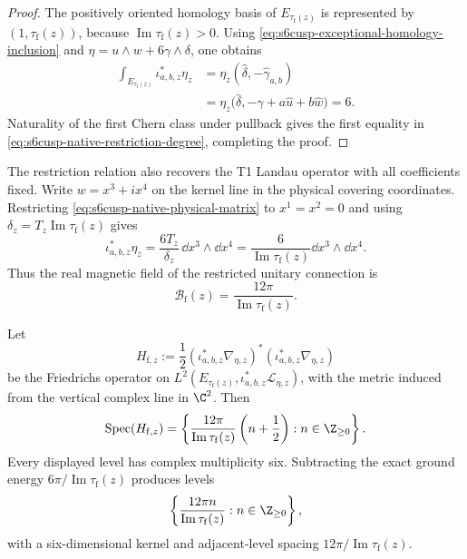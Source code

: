 \begin{proof}
The positively oriented homology basis of
\(E_{\tau_{\mathrm f}(z)}\) is represented by
\((1,\tau_{\mathrm f}(z))\), because
\(\operatorname{Im}\tau_{\mathrm f}(z)>0\).  Using
\eqref{eq:s6cusp-exceptional-homology-inclusion} and
\(\eta=u\wedge w+6\gamma\wedge\delta\), one obtains
\begin{align*}
 \int_{E_{\tau_{\mathrm f}(z)}}\iota_{a,b,z}^*\eta_z
 &=\eta_z(\widehat\delta,-\widehat\gamma_{a,b})\\
 &=\eta_z\bigl(
 \widehat\delta,
 -\widehat\gamma+a\widehat u+b\widehat w
 \bigr)=6.
\end{align*}
Naturality of the first Chern class under pullback gives the first equality
in \eqref{eq:s6cusp-native-restriction-degree}, completing the proof.
\end{proof}

The restriction relation also recovers the T1 Landau operator with all
coefficients fixed.  Write
\(w=x^3+ix^4\) on the kernel line in the physical covering coordinates.
Restricting \eqref{eq:s6cusp-native-physical-matrix} to
\(x^1=x^2=0\) and using
\(\delta_z=T_z\operatorname{Im}\tau_{\mathrm f}(z)\) gives
\begin{equation}\label{eq:s6cusp-exceptional-restricted-curvature}
 \iota_{a,b,z}^*\eta_z
 =\frac{6T_z}{\delta_z}\,\dd x^3\wedge\dd x^4
 =\frac{6}{\operatorname{Im}\tau_{\mathrm f}(z)}
 \dd x^3\wedge\dd x^4.
\end{equation}
Thus the real magnetic field of the restricted unitary connection is
\begin{equation}\label{eq:s6cusp-exceptional-magnetic-field}
 \mathcal B_{\mathrm f}(z)
 =\frac{12\pi}{\operatorname{Im}\tau_{\mathrm f}(z)}.
\end{equation}

\begin{corollary}
\label{cor:s6cusp-exceptional-landau-restriction}
Let
\begin{equation}\label{eq:s6cusp-exceptional-landau-Hamiltonian}
 H_{\mathrm f,z}:=\frac12
 (\iota_{a,b,z}^*\nabla_{\eta,z})^*
 (\iota_{a,b,z}^*\nabla_{\eta,z})
\end{equation}
be the Friedrichs operator on
\(L^2(E_{\tau_{\mathrm f}(z)},
\iota_{a,b,z}^*\mathcal L_{\eta,z})\), with the metric induced from the
vertical complex line in \(\C^2\).  Then
\begin{equation}\label{eq:s6cusp-exceptional-landau-spectrum}
 \operatorname{Spec}(H_{\mathrm f,z})
 =\left\{
 \frac{12\pi}{\operatorname{Im}\tau_{\mathrm f}(z)}
 \left(n+\frac12\right):n\in\Z_{\ge0}
 \right\}.
\end{equation}
Every displayed level has complex multiplicity six.  Subtracting the exact
ground energy
\(6\pi/\operatorname{Im}\tau_{\mathrm f}(z)\) produces levels
\begin{equation}\label{eq:s6cusp-exceptional-ground-shifted-spectrum}
 \left\{
 \frac{12\pi n}{\operatorname{Im}\tau_{\mathrm f}(z)}:
 n\in\Z_{\ge0}
 \right\},
\end{equation}
with a six-dimensional kernel and adjacent-level spacing
\(12\pi/\operatorname{Im}\tau_{\mathrm f}(z)\).
\end{corollary}


